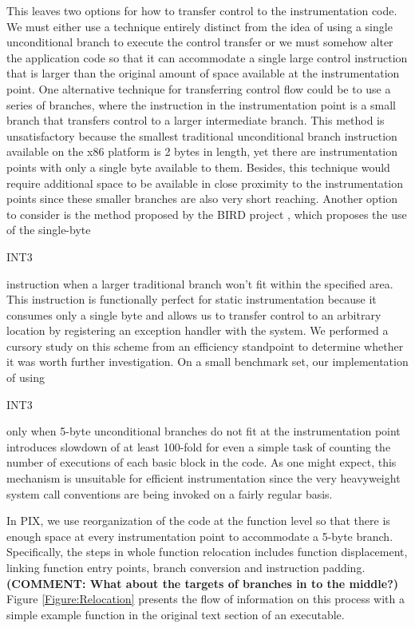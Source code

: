 This leaves two options for how to transfer control to the instrumentation code.
We must either use a technique entirely distinct from the idea of using a single
unconditional branch to execute the control transfer or we must somehow alter the application code so
that it can accommodate a single large control instruction that is larger than
the original amount of space available at the instrumentation point. One alternative
technique for transferring control flow could be to use a series of branches,
where the instruction in the instrumentation point is a small branch that
transfers control to a larger intermediate branch. This
method is unsatisfactory because the smallest traditional unconditional branch instruction available
on the x86 platform is 2 bytes in length, yet there are
instrumentation points with only a single byte available to them. Besides, this technique would
require additional space to be available in close proximity to the instrumentation points since these
smaller branches are also very short reaching. Another option
to consider is the method proposed by the BIRD project \cite{nanda2006bird}, which
proposes the use of the single-byte \begin{it}INT3\end{it} instruction when a larger traditional
branch won't fit within the specified area. This instruction is functionally
perfect for static instrumentation because it consumes only a single byte and
allows us to transfer control to an arbitrary location by registering an
exception handler with the system. We performed a cursory study on this scheme
from an efficiency standpoint to determine whether it was worth further
investigation. On a small benchmark set, our implementation of using
\begin{it}INT3\end{it} only when 5-byte unconditional branches do not fit at
the instrumentation point introduces slowdown of at least 100-fold for
even a simple task of counting the number of executions of each basic block in the code. As one might
expect, this mechanism is unsuitable for efficient instrumentation since the
very heavyweight system call conventions are being invoked on a fairly regular basis.

In PIX, we use reorganization of the code at the function level so that
there is enough space at every instrumentation point to accommodate a 5-byte
branch. Specifically, the steps in whole function relocation includes function displacement, linking function entry points,
branch conversion and instruction padding.  \textbf{(COMMENT: What about the targets of branches in to the middle?)}
Figure \ref{Figure:Relocation} presents the flow of information on this process with a simple example function in the original text section
of an executable.

